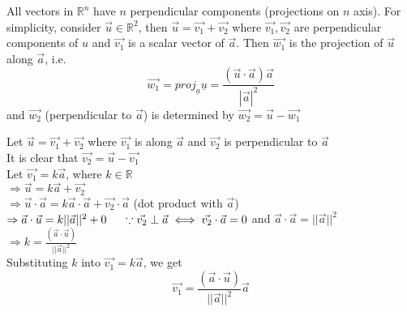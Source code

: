 \documentclass{article}
\begin{document}
\phantom{}

All vectors in $\mathbb{R}^n$ have $n$ perpendicular components (projections on $n$ axis). For simplicity, consider $\vec{u} \in \mathbb{R}^2$, then $\vec{u} = \vec{v_1} + \vec{v_2}$ where $\vec{v_1}, \vec{v_2}$ are perpendicular components of $u$ and $\vec{v_1}$ is a scalar vector of $\vec{a}$. Then $\vec{w_1}$ is the projection of $\vec{u}$ along $\vec{a}$, i.e. $$\vec{w_1} = proj_{\underline{a}}\underline{u} = \frac{(\vec{u} \cdot \vec{a}) \vec{a}}{|\vec{a}|^2}$$ and $\vec{w_2}$ (perpendicular to $\vec{a}$) is determined by $\vec{w_2} = \vec{u} - \vec{w_1}$

\begin{tcolorbox}[colback=lightgray!20, colframe=lightgray!20, fontupper=\linespread{1.5}\selectfont]
	\begin{center}
	\end{center}
	Let $\vec{u} = \vec{v_1} + \vec{v_2}$ where $\vec{v_1}$ is along $\vec{a}$ and $\vec{v_2}$ is perpendicular to $\vec{a}$ \\
	It is clear that $\vec{v_2} = \vec{u} - \vec{v_1}$ \\
	Let $\vec{v_1} = k\vec{a}$, where $k \in \mathbb{R}$ \\
	$\Rightarrow \vec{u} = k\vec{a} + \vec{v_2}$ \\
	$\Rightarrow \vec{u} \cdot \vec{a} = k\vec{a} \cdot \vec{a} + \vec{v_2} \cdot \vec{a}$ (dot product with $\vec{a}$) \\
	$\Rightarrow \vec{a} \cdot \vec{u} = k||\vec{a}||^2 + 0 \hspace{0.5cm} \because \vec{v_2} \perp \vec{a} \iff \vec{v_2} \cdot \vec{a} = 0$ and $\vec{a} \cdot \vec{a} = ||\vec{a}||^2$ \\
	$\Rightarrow k = \frac{(\vec{a} \cdot \vec{u})}{||\vec{a}||^2}$ \\
	Substituting $k$ into $\vec{v_1} = k\vec{a}$, we get
	$$\vec{v_1} = \frac{(\vec{a} \cdot \vec{u})}{||\vec{a}||^2}\vec{a}$$
\end{tcolorbox}
\end{document}
